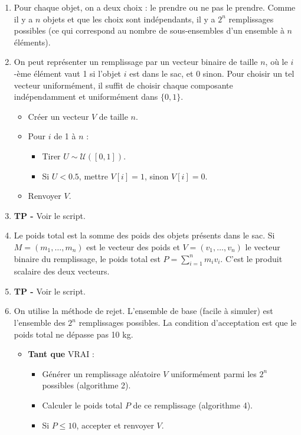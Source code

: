 \documentclass[solutions]{exercices}
\begin{document}
\begin{solution}
\begin{enumerate}
  \item Pour chaque objet, on a deux choix : le prendre ou ne pas le prendre. Comme il y a $n$ objets et que les choix sont indépendants, il y a $2^n$ remplissages possibles (ce qui correspond au nombre de sous-ensembles d'un ensemble à $n$ éléments).
  \item On peut représenter un remplissage par un vecteur binaire de taille $n$, où le $i$-ème élément vaut 1 si l'objet $i$ est dans le sac, et 0 sinon. Pour choisir un tel vecteur uniformément, il suffit de choisir chaque composante indépendamment et uniformément dans $\{0,1\}$.
  \begin{itemize}
      \item Créer un vecteur $V$ de taille $n$.
      \item Pour $i$ de 1 à $n$ :
      \begin{itemize}
          \item Tirer $U \sim \mathcal{U}([0,1])$.
          \item Si $U < 0.5$, mettre $V[i] = 1$, sinon $V[i] = 0$.
      \end{itemize}
      \item Renvoyer $V$.
  \end{itemize}
  \item \textbf{TP -} Voir le script.
  \item Le poids total est la somme des poids des objets présents dans le sac. Si $M=(m_1, \dots, m_n)$ est le vecteur des poids et $V=(v_1, \dots, v_n)$ le vecteur binaire du remplissage, le poids total est $P = \sum_{i=1}^n m_i v_i$. C'est le produit scalaire des deux vecteurs.
  \item \textbf{TP -} Voir le script.
  \item On utilise la méthode de rejet. L'ensemble de base (facile à simuler) est l'ensemble des $2^n$ remplissages possibles. La condition d'acceptation est que le poids total ne dépasse pas 10 kg.
  \begin{itemize}
      \item \textbf{Tant que} VRAI :
      \begin{itemize}
          \item Générer un remplissage aléatoire $V$ uniformément parmi les $2^n$ possibles (algorithme 2).
          \item Calculer le poids total $P$ de ce remplissage (algorithme 4).
          \item Si $P \le 10$, accepter et renvoyer $V$.

\end{itemize}
\end{itemize}
\end{enumerate}
\end{solution}
\end{document}
